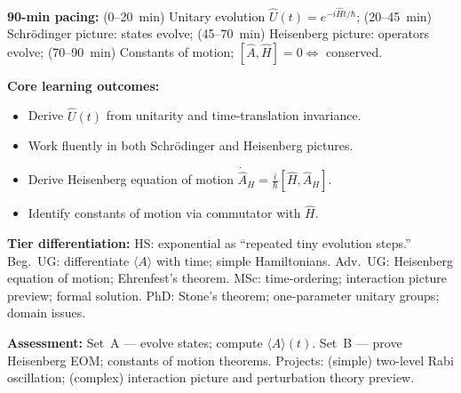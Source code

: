 \documentclass[11pt,a4paper]{article}
\begin{document}
\medskip
\begin{tcolorbox}[modulebox, title={Module~I.2 / L08: Time Evolution \& Pictures of Quantum Mechanics}]
\textbf{90-min pacing:} (0--20~min) Unitary evolution $\hat{U}(t)=e^{-i\hat{H}t/\hbar}$;
(20--45~min) Schr\"odinger picture: states evolve;
(45--70~min) Heisenberg picture: operators evolve;
(70--90~min) Constants of motion; $[\hat{A},\hat{H}]=0\Leftrightarrow$ conserved.

\medskip\textbf{Core learning outcomes:}
\begin{itemize}[leftmargin=1.4em,topsep=2pt,itemsep=1pt]
  \item Derive $\hat{U}(t)$ from unitarity and time-translation invariance.
  \item Work fluently in both Schr\"odinger and Heisenberg pictures.
  \item Derive Heisenberg equation of motion $\dot{\hat{A}}_H=\tfrac{i}{\hbar}[\hat{H},\hat{A}_H]$.
  \item Identify constants of motion via commutator with $\hat{H}$.
\end{itemize}

\medskip\textbf{Tier differentiation:}
HS: exponential as ``repeated tiny evolution steps.''
Beg.\ UG: differentiate $\langle A\rangle$ with time; simple Hamiltonians.
Adv.\ UG: Heisenberg equation of motion; Ehrenfest's theorem.
MSc: time-ordering; interaction picture preview; formal solution.
PhD: Stone's theorem; one-parameter unitary groups; domain issues.

\medskip\textbf{Assessment:}
Set~A --- evolve states; compute $\langle A\rangle(t)$.
Set~B --- prove Heisenberg EOM; constants of motion theorems.
Projects: (simple) two-level Rabi oscillation; (complex) interaction picture and perturbation theory preview.
\end{tcolorbox}
\end{document}
